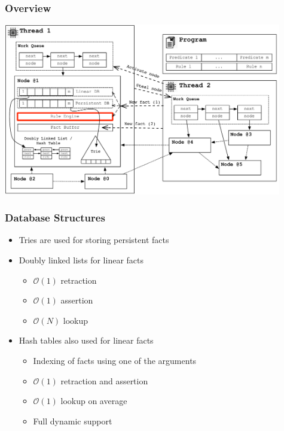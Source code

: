 \documentclass{beamer}
\begin{document}
\begin{frame}[fragile]
   \frametitle{Overview}
   \includegraphics[height=7.5cm]{overview3.pdf}
\end{frame}

\begin{frame}[fragile]
   \frametitle{Database Structures}
   \begin{itemize}
      \item Tries are used for storing persistent facts
      \item Doubly linked lists for linear facts
      \begin{itemize}
         \item $\mathcal{O}(1)$ retraction
         \item $\mathcal{O}(1)$ assertion
         \item $\mathcal{O}(N)$ lookup
      \end{itemize}
      \item Hash tables also used for linear facts
      \begin{itemize}
         \item Indexing of facts using one of the arguments
         \item $\mathcal{O}(1)$ retraction and assertion
         \item $\mathcal{O}(1)$ lookup on average
         \item Full dynamic support
      \end{itemize}
   \end{itemize}
\end{frame}
\end{document}
